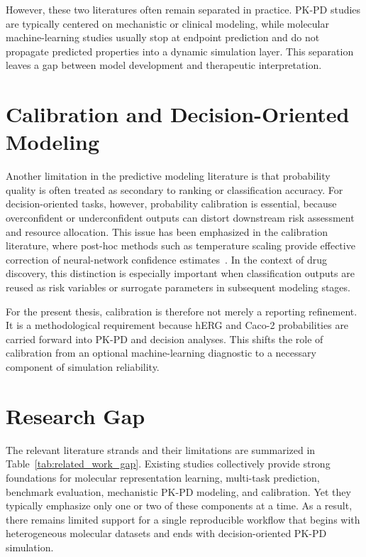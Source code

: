 \documentclass[a4paper,11pt,twoside]{report}
\begin{document}
However, these two literatures often remain separated in practice. PK-PD studies are typically centered on mechanistic or clinical modeling, while molecular machine-learning studies usually stop at endpoint prediction and do not propagate predicted properties into a dynamic simulation layer. This separation leaves a gap between model development and therapeutic interpretation.

\section{Calibration and Decision-Oriented Modeling}

Another limitation in the predictive modeling literature is that probability quality is often treated as secondary to ranking or classification accuracy. For decision-oriented tasks, however, probability calibration is essential, because overconfident or underconfident outputs can distort downstream risk assessment and resource allocation. This issue has been emphasized in the calibration literature, where post-hoc methods such as temperature scaling provide effective correction of neural-network confidence estimates~\cite{guo2017}. In the context of drug discovery, this distinction is especially important when classification outputs are reused as risk variables or surrogate parameters in subsequent modeling stages.

For the present thesis, calibration is therefore not merely a reporting refinement. It is a methodological requirement because hERG and Caco-2 probabilities are carried forward into PK-PD and decision analyses. This shifts the role of calibration from an optional machine-learning diagnostic to a necessary component of simulation reliability.

\section{Research Gap}

The relevant literature strands and their limitations are summarized in Table~\ref{tab:related_work_gap}. Existing studies collectively provide strong foundations for molecular representation learning, multi-task prediction, benchmark evaluation, mechanistic PK-PD modeling, and calibration. Yet they typically emphasize only one or two of these components at a time. As a result, there remains limited support for a single reproducible workflow that begins with heterogeneous molecular datasets and ends with decision-oriented PK-PD simulation.
\end{document}

